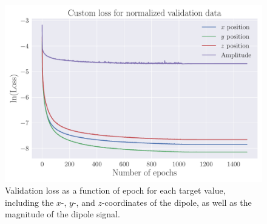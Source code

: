 \documentclass[a4paper, UKenglish, 11pt]{uiomaster}
\begin{document}
\begin{figure}[!htb]
    \centering
    \includegraphics[width=\linewidth]{figures/NN_magnitude/Custom_Loss_mse_targets_amplitudes_test_custom_loss_tanh_32_0.001_0.35_0.1_0_1500_(0).pdf}
    \caption{Validation loss as a function of epoch for each target value, including the $x$-, $y$-, and $z$-coordinates of the dipole, as well as the magnitude of the dipole signal.}
    \label{fig:dipole_w_amplitude_targets}
\end{figure}


\end{document}

